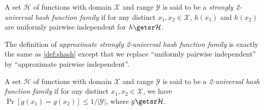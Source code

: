 
\begin{definition}
\label{def:shash}
	A set $\mathcal H$ of functions with domain $\mathcal X$ and range $\mathcal Y$ is said to be a \emph{strongly 2-universal hash function family} if for any distinct $x_1,x_2 \in \mathcal{X}$, $h(x_1)$ and $h(x_2)$ are uniformly pairwise independent for $h\getsr \mathcal H$.
\end{definition}

\begin{definition}
\label{def:ahash}
The definition of \emph{approximate strongly 2-universal hash function family} is exactly the same as \cref{def:shash} except that we replace ``uniformly pairwise independent'' by ``approximate pairwise independent''.
\end{definition}


\begin{definition}
\label{def:hash}
	A set $\mathcal H$ of functions with domain $\mathcal X$ and range $\mathcal Y$ is said to be a \emph{2-universal hash function family} if for any distinct $x_1,x_2 \in \mathcal{X}$, we have
	$\Pr[g(x_1)=g(x_2)]\leq 1/|\mathcal Y|$, where $g \getsr \mathcal H$.
\end{definition}

